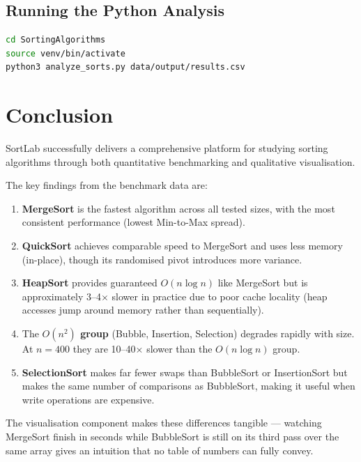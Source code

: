 \documentclass[12pt,a4paper]{article}
\begin{document}
\subsection{Running the Python Analysis}

\begin{lstlisting}[language=bash, style=pythonstyle,
                   caption={Analysis script usage}]
cd SortingAlgorithms
source venv/bin/activate
python3 analyze_sorts.py data/output/results.csv
\end{lstlisting}

\section{Conclusion}

SortLab successfully delivers a comprehensive platform for studying sorting
algorithms through both quantitative benchmarking and qualitative visualisation.

The key findings from the benchmark data are:

\begin{enumerate}
    \item \textbf{MergeSort} is the fastest algorithm across all tested sizes,
          with the most consistent performance (lowest Min-to-Max spread).
    \item \textbf{QuickSort} achieves comparable speed to MergeSort and uses
          less memory (in-place), though its randomised pivot introduces more
          variance.
    \item \textbf{HeapSort} provides guaranteed $O(n \log n)$ like MergeSort
          but is approximately 3--4$\times$ slower in practice due to poor
          cache locality (heap accesses jump around memory rather than
          sequentially).
    \item The \textbf{$O(n^2)$ group} (Bubble, Insertion, Selection) degrades
          rapidly with size. At $n=400$ they are 10--40$\times$ slower than
          the $O(n \log n)$ group.
    \item \textbf{SelectionSort} makes far fewer swaps than BubbleSort or
          InsertionSort but makes the same number of comparisons as BubbleSort,
          making it useful when write operations are expensive.
\end{enumerate}

The visualisation component makes these differences tangible — watching MergeSort
finish in seconds while BubbleSort is still on its third pass over the same
array gives an intuition that no table of numbers can fully convey.
\end{document}
